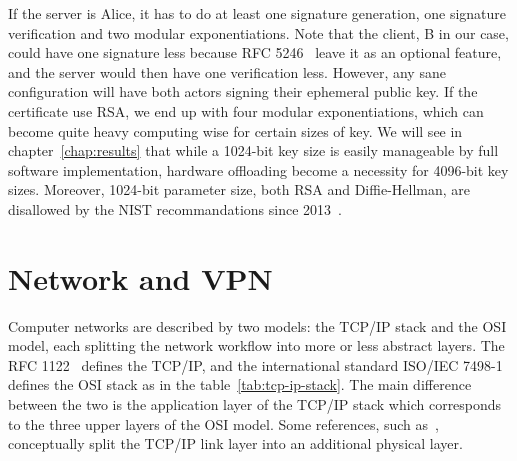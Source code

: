 If the server is Alice, it has to do at least one signature generation, one signature verification and two modular exponentiations.
Note that the client, B in our case, could have one signature less because RFC 5246~\cite{rfc5246} leave it as an optional feature, and the server would then have one verification less.
However, any sane configuration will have both actors signing their ephemeral public key.
If the certificate use RSA, we end up with four modular exponentiations, which can become quite heavy computing wise for certain sizes of key.
We will see in chapter~\ref{chap:results} that while a 1024-bit key size is easily manageable by full software implementation, hardware offloading become a necessity for 4096-bit key sizes.
Moreover, 1024-bit parameter size, both RSA and Diffie-Hellman, are disallowed by the NIST recommandations since 2013~\cite{nist-sp800-131A}.












\section{Network and VPN}\label{sec:theory-network}

Computer networks are described by two models: the TCP/IP stack and the OSI model, each splitting the network workflow into more or less abstract layers.
The RFC 1122~\cite{rfc1122} defines the TCP/IP, and the international standard ISO/IEC 7498-1~\cite{ISOIEC7498} defines the OSI stack as in the table~\ref{tab:tcp-ip-stack}.
The main difference between the two is the application layer of the TCP/IP stack which corresponds to the three upper layers of the OSI model.
Some references, such as~\citet{tanenbaum2011}, conceptually split the TCP/IP link layer into an additional physical layer.

